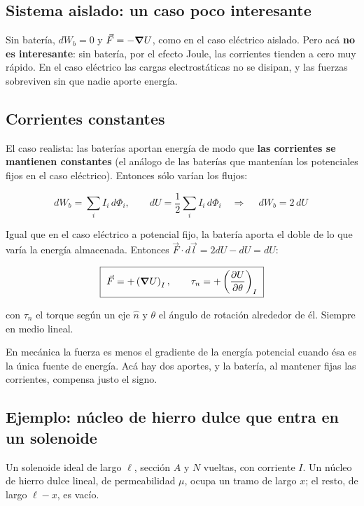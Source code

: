 \documentclass[12pt,a4paper]{article}
\begin{document}
\subsection{Sistema aislado: un caso poco interesante}

Sin batería, $dW_b = 0$ y $\vec F = -\grad U$, como en el caso eléctrico
aislado. Pero acá \textbf{no es interesante}: sin batería, por el efecto Joule, las
corrientes tienden a cero muy rápido. En el caso eléctrico las cargas
electrostáticas no se disipan, y las fuerzas sobreviven sin que nadie aporte
energía.

\subsection{Corrientes constantes}

El caso realista: las baterías aportan energía de modo que \textbf{las corrientes se
mantienen constantes} (el análogo de las baterías que mantenían los potenciales
fijos en el caso eléctrico). Entonces sólo varían los flujos:

\[
dW_b = \sum_i I_i\,d\Phi_i,
\qquad
dU = \frac12\sum_i I_i\,d\Phi_i
\quad\Longrightarrow\quad
\boxed{\ dW_b = 2\,dU\ }
\]

Igual que en el caso eléctrico a potencial fijo, la batería aporta el doble de
lo que varía la energía almacenada. Entonces $\vec F\cdot d\vec l = 2dU - dU = dU$:

\begin{keybox}
\[
\boxed{\ \vec F = +\left(\grad U\right)_{I},
\qquad \tau_n = +\left(\pdv{U}{\theta}\right)_{I}\ }
\]
\end{keybox}
con $\tau_n$ el torque según un eje $\hat n$ y $\theta$ el ángulo de rotación
alrededor de él. Siempre en medio lineal.

\begin{notebox}
En mecánica la fuerza es menos el gradiente de la
energía potencial cuando ésa es la única fuente de energía. Acá hay dos
aportes, y la batería, al mantener fijas las corrientes, compensa justo el
signo.
\end{notebox}

\subsection{Ejemplo: núcleo de hierro dulce que entra en un solenoide}

Un solenoide ideal de largo $\ell$, sección $A$ y $N$ vueltas, con corriente
$I$. Un núcleo de hierro dulce lineal, de permeabilidad $\mu$, ocupa un tramo de
largo $x$; el resto, de largo $\ell - x$, es vacío.
\end{document}
